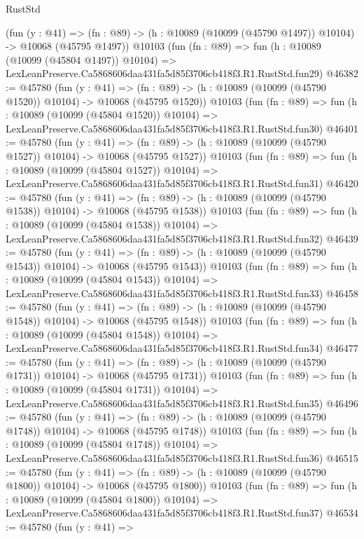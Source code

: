 \begin{lexlean}{RustStd}
\begin{coremodule}
    (fun (y : @41) =>
    (fn : @89) -> (h : @10089 (@10099 (@45790 @1497)) @10104) -> @10068 (@45795 @1497))
    @10103
    (fun (fn : @89) =>
    fun (h : @10089 (@10099 (@45804 @1497)) @10104) =>
    LexLeanPreserve.Ca5868606daa431fa5d85f3706cb418f3.R1.RustStd.fun29)
@46382 := @45780
    (fun (y : @41) =>
    (fn : @89) -> (h : @10089 (@10099 (@45790 @1520)) @10104) -> @10068 (@45795 @1520))
    @10103
    (fun (fn : @89) =>
    fun (h : @10089 (@10099 (@45804 @1520)) @10104) =>
    LexLeanPreserve.Ca5868606daa431fa5d85f3706cb418f3.R1.RustStd.fun30)
@46401 := @45780
    (fun (y : @41) =>
    (fn : @89) -> (h : @10089 (@10099 (@45790 @1527)) @10104) -> @10068 (@45795 @1527))
    @10103
    (fun (fn : @89) =>
    fun (h : @10089 (@10099 (@45804 @1527)) @10104) =>
    LexLeanPreserve.Ca5868606daa431fa5d85f3706cb418f3.R1.RustStd.fun31)
@46420 := @45780
    (fun (y : @41) =>
    (fn : @89) -> (h : @10089 (@10099 (@45790 @1538)) @10104) -> @10068 (@45795 @1538))
    @10103
    (fun (fn : @89) =>
    fun (h : @10089 (@10099 (@45804 @1538)) @10104) =>
    LexLeanPreserve.Ca5868606daa431fa5d85f3706cb418f3.R1.RustStd.fun32)
@46439 := @45780
    (fun (y : @41) =>
    (fn : @89) -> (h : @10089 (@10099 (@45790 @1543)) @10104) -> @10068 (@45795 @1543))
    @10103
    (fun (fn : @89) =>
    fun (h : @10089 (@10099 (@45804 @1543)) @10104) =>
    LexLeanPreserve.Ca5868606daa431fa5d85f3706cb418f3.R1.RustStd.fun33)
@46458 := @45780
    (fun (y : @41) =>
    (fn : @89) -> (h : @10089 (@10099 (@45790 @1548)) @10104) -> @10068 (@45795 @1548))
    @10103
    (fun (fn : @89) =>
    fun (h : @10089 (@10099 (@45804 @1548)) @10104) =>
    LexLeanPreserve.Ca5868606daa431fa5d85f3706cb418f3.R1.RustStd.fun34)
@46477 := @45780
    (fun (y : @41) =>
    (fn : @89) -> (h : @10089 (@10099 (@45790 @1731)) @10104) -> @10068 (@45795 @1731))
    @10103
    (fun (fn : @89) =>
    fun (h : @10089 (@10099 (@45804 @1731)) @10104) =>
    LexLeanPreserve.Ca5868606daa431fa5d85f3706cb418f3.R1.RustStd.fun35)
@46496 := @45780
    (fun (y : @41) =>
    (fn : @89) -> (h : @10089 (@10099 (@45790 @1748)) @10104) -> @10068 (@45795 @1748))
    @10103
    (fun (fn : @89) =>
    fun (h : @10089 (@10099 (@45804 @1748)) @10104) =>
    LexLeanPreserve.Ca5868606daa431fa5d85f3706cb418f3.R1.RustStd.fun36)
@46515 := @45780
    (fun (y : @41) =>
    (fn : @89) -> (h : @10089 (@10099 (@45790 @1800)) @10104) -> @10068 (@45795 @1800))
    @10103
    (fun (fn : @89) =>
    fun (h : @10089 (@10099 (@45804 @1800)) @10104) =>
    LexLeanPreserve.Ca5868606daa431fa5d85f3706cb418f3.R1.RustStd.fun37)
@46534 := @45780
    (fun (y : @41) =>

\end{coremodule}
\end{lexlean}
